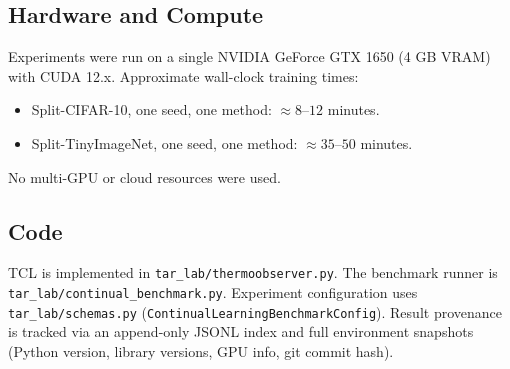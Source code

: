 \documentclass[10pt,a4paper]{article}
\begin{document}
\subsection{Hardware and Compute}

Experiments were run on a single NVIDIA GeForce GTX 1650 (4 GB VRAM) with
CUDA 12.x.
Approximate wall-clock training times:
\begin{itemize}
  \item Split-CIFAR-10, one seed, one method: ${\approx}8$--$12$ minutes.
  \item Split-TinyImageNet, one seed, one method: ${\approx}35$--$50$ minutes.
\end{itemize}
No multi-GPU or cloud resources were used.

\subsection{Code}

TCL is implemented in \texttt{tar\_lab/thermoobserver.py}.
The benchmark runner is \texttt{tar\_lab/continual\_benchmark.py}.
Experiment configuration uses \texttt{tar\_lab/schemas.py}
(\texttt{ContinualLearningBenchmarkConfig}).
Result provenance is tracked via an append-only JSONL index and full environment
snapshots (Python version, library versions, GPU info, git commit hash).
\end{document}
